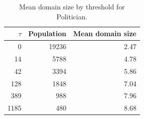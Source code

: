 \begin{table}[htbp]
\centering
\small
\begin{tabular}{r r r}
\hline
$\tau$ & Population & Mean domain size \\
\hline
0 & 19236 & 2.47 \\
14 & 5788 & 4.78 \\
42 & 3394 & 5.86 \\
128 & 1848 & 7.04 \\
389 & 988 & 7.96 \\
1185 & 480 & 8.68 \\
\hline
\end{tabular}
\caption{Mean domain size by threshold for Politician.}
\label{tab:mean-size-Politician}
\end{table}
